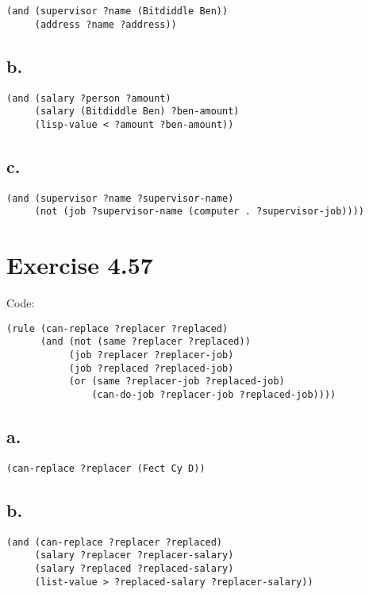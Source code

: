 \documentclass[../main.tex]{subfiles}
\begin{document}
\begin{lstlisting}
(and (supervisor ?name (Bitdiddle Ben))
     (address ?name ?address))
\end{lstlisting}

\subsection{b.}

\begin{lstlisting}
(and (salary ?person ?amount)
     (salary (Bitdiddle Ben) ?ben-amount)
     (lisp-value < ?amount ?ben-amount))
\end{lstlisting}

\subsection{c.}

\begin{lstlisting}
(and (supervisor ?name ?supervisor-name)
     (not (job ?supervisor-name (computer . ?supervisor-job))))
\end{lstlisting}

\section{Exercise 4.57}

Code:

\begin{lstlisting}
(rule (can-replace ?replacer ?replaced)
      (and (not (same ?replacer ?replaced))
           (job ?replacer ?replacer-job)
           (job ?replaced ?replaced-job)
           (or (same ?replacer-job ?replaced-job)
               (can-do-job ?replacer-job ?replaced-job))))
\end{lstlisting}

\subsection{a.}

\begin{lstlisting}
(can-replace ?replacer (Fect Cy D))
\end{lstlisting}

\subsection{b.}

\begin{lstlisting}
(and (can-replace ?replacer ?replaced)
     (salary ?replacer ?replacer-salary)
     (salary ?replaced ?replaced-salary)
     (list-value > ?replaced-salary ?replacer-salary))
\end{lstlisting}
\end{document}
